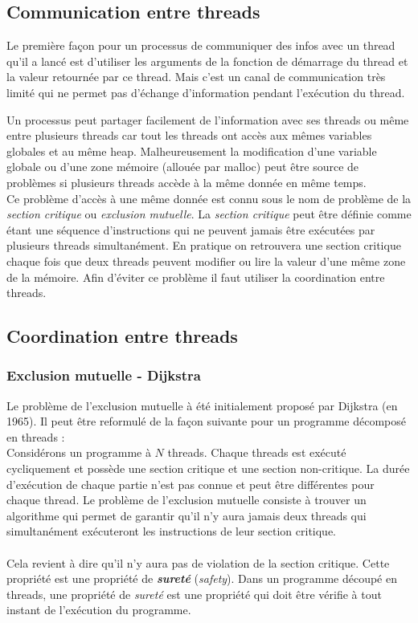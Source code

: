 \subsection{Communication entre threads}
Le première façon pour un processus de communiquer des infos avec un thread qu'il a lancé est d'utiliser les arguments de la fonction de démarrage du thread et la valeur retournée par ce thread.
Mais c'est un canal de communication très limité qui ne permet pas d'échange d'information pendant l'exécution du thread.

Un processus peut partager facilement de l'information avec ses threads ou même entre plusieurs threads car tout les threads ont accès aux mêmes variables globales et au même heap.
Malheureusement la modification d'une variable globale ou d'une zone mémoire (allouée par malloc) peut être source de problèmes si plusieurs threads accède à la même donnée en même temps.\\
Ce problème d'accès à une même donnée est connu sous le nom de problème de la \emph{section critique} ou \emph{exclusion mutuelle}.
La \emph{section critique} peut être définie comme étant une séquence d'instructions qui ne peuvent jamais être exécutées par plusieurs threads simultanément.
En pratique on retrouvera une section critique chaque fois que deux threads peuvent modifier ou lire la valeur d'une même zone de la mémoire.
Afin d'éviter ce problème il faut utiliser la coordination entre threads.

\subsection{Coordination entre threads}
\subsubsection{Exclusion mutuelle - Dijkstra}
Le problème de l'exclusion mutuelle à été initialement proposé par Dijkstra (en 1965).
Il peut être reformulé de la façon suivante pour un programme décomposé en threads : \\
Considérons un programme à $N$ threads.
Chaque threads est exécuté cycliquement et possède une section critique et une section non-critique.
La durée d'exécution de chaque partie n'est pas connue et peut être différentes pour chaque thread.
Le problème de l'exclusion mutuelle consiste à trouver un algorithme qui permet de garantir qu'il n'y aura jamais deux threads qui simultanément exécuteront les instructions de leur section critique.\\
\\
Cela revient à dire qu'il n'y aura pas de violation de la section critique.
Cette propriété est une propriété de \textbf{\textit{sureté}} (\textit{safety}).
Dans un programme découpé en threads, une propriété de \textit{sureté} est une propriété qui doit être vérifie à tout instant de l'exécution du programme.

